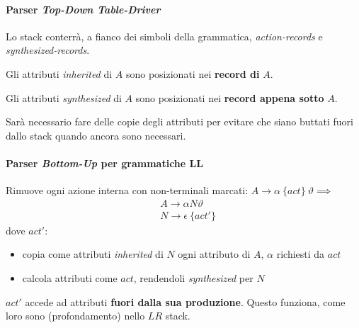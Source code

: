 \paragraph{Parser \textit{Top-Down Table-Driver}}
Lo stack conterr\`a, a fianco dei simboli della grammatica,
\textit{action-records} e \textit{synthesized-records}.

Gli attributi \textit{inherited} di $A$ sono posizionati nei \textbf{record
di} $A$.

Gli attributi \textit{synthesized} di $A$ sono posizionati nei \textbf{record
appena sotto} $A$.

Sar\`a necessario fare delle copie degli attributi per evitare che siano buttati
fuori dallo stack quando ancora sono necessari.

\paragraph{Parser \textit{Bottom-Up} per grammatiche LL}
Rimuove ogni azione interna con non-terminali marcati:
$A \to \alpha \ \{act\} \ \vartheta \implies$
\begin{align*}
& A \to \alpha N\vartheta \\
& N \to \epsilon \ \{act'\}
\end{align*}
dove $act'$:
\begin{itemize}
\item copia come attributi \textit{inherited} di $N$ ogni attributo di $A$,
$\alpha$ richiesti da $act$
\item calcola attributi come $act$, rendendoli \textit{synthesized} per $N$
\end{itemize}

$act'$ accede ad attributi \textbf{fuori dalla sua produzione}. Questo funziona,
come loro sono (profondamento) nello $LR$ stack.
